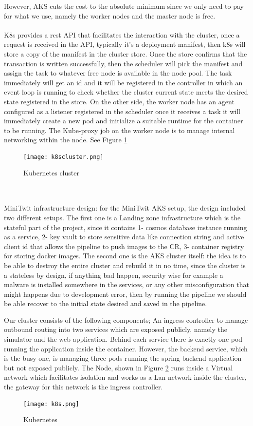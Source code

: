 However, AKS cuts the cost to the absolute minimum since we only need to pay for what we use, namely the worker nodes and the master node is free.
\\\\
K8s provides a rest API that facilitates the interaction with the cluster, once a request is received in the API, typically it's a deployment manifest, then k8s will store a copy of the manifest in the cluster store. Once the store confirms that the transaction is written successfully, then the scheduler will pick the manifest and assign the task to whatever free node is available in the node pool. The task immediately will get an id and it will be registered in the controller in which an event loop is running to check whether the cluster current state meets the desired state registered in the store. On the other side, the worker node has an agent configured as a listener registered in the scheduler once it receives a task it will immediately create a new pod and initialize a suitable runtime for the container to be running. The Kube-proxy job on the worker node is to manage internal networking within the node. See Figure \ref{fig:k8scluster}
\begin{figure}[h]
    \centering
    \texttt{[image: k8scluster.png]}
    \caption{Kubernetes cluster\cite{https://kubernetes.io/KubernetesKubernetes}}
    \label{fig:k8scluster}
\end{figure}
\\\\


MiniTwit infrastructure design: for the MiniTwit AKS setup, the design included two different setups. The first one is a Landing zone infrastructure which is the stateful part of the project, since it contains 1- cosmos database instance running as a service, 2- key vault to store sensitive data like connection string and active client id that allows the pipeline to push images to the CR, 3- container registry for storing docker images. The second one is the AKS cluster itself: the idea is to be able to destroy the entire cluster and rebuild it in no time, since the cluster is a stateless by design, if anything bad happen, security wise for example a malware is installed somewhere in the services, or any other misconfiguration that might happens due to development error, then by running the pipeline we should be able recover to the initial state desired and saved in the pipeline. 

Our cluster consists of the following components; An ingress controller to manage outbound routing into two services which are exposed publicly, namely the simulator and the web application. Behind each service there is exactly one pod running the application inside the container. However, the backend service, which is the busy one, is managing three pods running the spring backend application but not exposed publicly. The Node, shown in Figure \ref{fig:k8s} runs inside a Virtual network which facilitates isolation and works as a Lan network inside the cluster, the gateway for this network is the ingress controller.

\begin{figure}[h]
    \centering
    \texttt{[image: k8s.png]}
    \caption{Kubernetes}
    \label{fig:k8s}
\end{figure}

